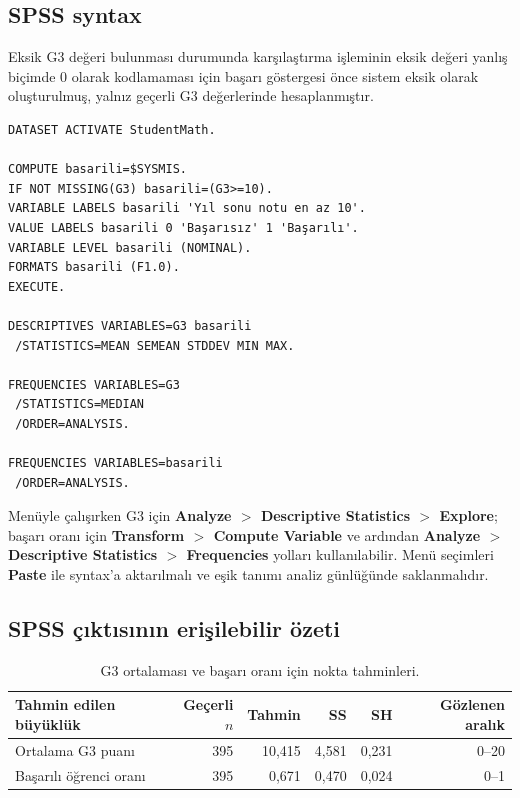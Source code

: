 \subsection{SPSS syntax}

Eksik G3 değeri bulunması durumunda karşılaştırma işleminin eksik değeri yanlış
biçimde 0 olarak kodlamaması için başarı göstergesi önce sistem eksik olarak
oluşturulmuş, yalnız geçerli G3 değerlerinde hesaplanmıştır.

\begin{lstlisting}[language={}]
DATASET ACTIVATE StudentMath.

COMPUTE basarili=$SYSMIS.
IF NOT MISSING(G3) basarili=(G3>=10).
VARIABLE LABELS basarili 'Yıl sonu notu en az 10'.
VALUE LABELS basarili 0 'Başarısız' 1 'Başarılı'.
VARIABLE LEVEL basarili (NOMINAL).
FORMATS basarili (F1.0).
EXECUTE.

DESCRIPTIVES VARIABLES=G3 basarili
 /STATISTICS=MEAN SEMEAN STDDEV MIN MAX.

FREQUENCIES VARIABLES=G3
 /STATISTICS=MEDIAN
 /ORDER=ANALYSIS.

FREQUENCIES VARIABLES=basarili
 /ORDER=ANALYSIS.
\end{lstlisting}

Menüyle çalışırken G3 için \textbf{Analyze $>$ Descriptive Statistics $>$
Explore}; başarı oranı için \textbf{Transform $>$ Compute Variable} ve
ardından \textbf{Analyze $>$ Descriptive Statistics $>$ Frequencies} yolları
kullanılabilir. Menü seçimleri \textbf{Paste} ile syntax'a aktarılmalı ve
eşik tanımı analiz günlüğünde saklanmalıdır.

\subsection{SPSS çıktısının erişilebilir özeti}

\begin{table}[htbp]
\centering
\caption{G3 ortalaması ve başarı oranı için nokta tahminleri.}
\begin{tabular}{@{}p{}rrrrr@{}}
\toprule
Tahmin edilen büyüklük & Geçerli $n$ & Tahmin & SS & SH & Gözlenen aralık \\
\midrule
Ortalama G3 puanı & 395 & 10,415 & 4,581 & 0,231 & 0--20 \\
Başarılı öğrenci oranı & 395 & 0,671 & 0,470 & 0,024 & 0--1 \\
\bottomrule
\end{tabular}
\end{table}

